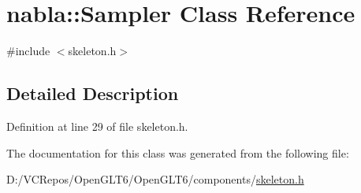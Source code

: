 \hypertarget{classnabla_1_1_sampler}{}\section{nabla\+::Sampler Class Reference}
\label{classnabla_1_1_sampler}


{\ttfamily \#include $<$skeleton.\+h$>$}



\subsection{Detailed Description}


Definition at line 29 of file skeleton.\+h.



The documentation for this class was generated from the following file\+:\begin{DoxyCompactItemize}
\item 
D\+:/\+V\+C\+Repos/\+Open\+G\+L\+T6/\+Open\+G\+L\+T6/components/\mbox{\hyperlink{skeleton_8h}{skeleton.\+h}}\end{DoxyCompactItemize}
